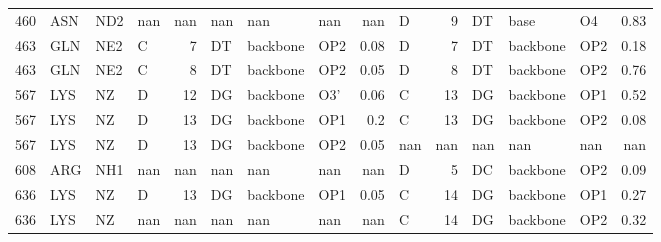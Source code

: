 \begin{longtable}{rlllrlllrlrlllr}
       460 & ASN        & ND2    & nan       &         nan & nan          & nan         & nan      &        nan    & D         &           9 & DT           & base        & O4       &          0.83 \\
       463 & GLN        & NE2    & C         &           7 & DT           & backbone    & OP2      &          0.08 & D         &           7 & DT           & backbone    & OP2      &          0.18 \\
       463 & GLN        & NE2    & C         &           8 & DT           & backbone    & OP2      &          0.05 & D         &           8 & DT           & backbone    & OP2      &          0.76 \\
       567 & LYS        & NZ     & D         &          12 & DG           & backbone    & O3'      &          0.06 & C         &          13 & DG           & backbone    & OP1      &          0.52 \\
       567 & LYS        & NZ     & D         &          13 & DG           & backbone    & OP1      &          0.2  & C         &          13 & DG           & backbone    & OP2      &          0.08 \\
       567 & LYS        & NZ     & D         &          13 & DG           & backbone    & OP2      &          0.05 & nan       &         nan & nan          & nan         & nan      &        nan    \\
       608 & ARG        & NH1    & nan       &         nan & nan          & nan         & nan      &        nan    & D         &           5 & DC           & backbone    & OP2      &          0.09 \\
       636 & LYS        & NZ     & D         &          13 & DG           & backbone    & OP1      &          0.05 & C         &          14 & DG           & backbone    & OP1      &          0.27 \\
       636 & LYS        & NZ     & nan       &         nan & nan          & nan         & nan      &        nan    & C         &          14 & DG           & backbone    & OP2      &          0.32 \\
\hline
\end{longtable}